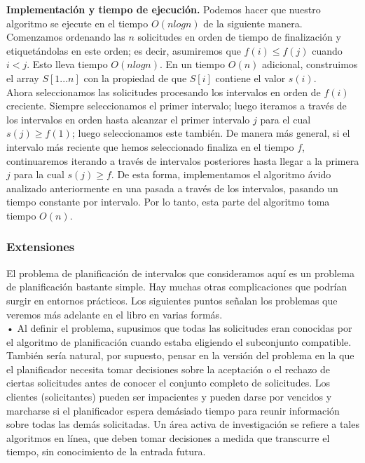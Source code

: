\documentclass[a4paper, 12pt]{book}
\begin{document}
\textbf{Implementación y tiempo de ejecución.} Podemos hacer que nuestro algoritmo se ejecute en el tiempo $O(nlogn)$ de la siguiente manera. Comenzamos ordenando las $n$ solicitudes en orden de tiempo de finalización y etiquetándolas en este orden; es decir, asumiremos que $f(i) ≤ f(j)$ cuando $i<j$. Esto lleva tiempo $O(nlogn)$. En un tiempo $O(n)$ adicional, construimos el array $S[1...n]$ con la propiedad de que $S[i]$ contiene el valor $s(i)$.\\

Ahora seleccionamos las solicitudes procesando los intervalos en orden de $f(i)$ creciente. Siempre seleccionamos el primer intervalo; luego iteramos a través de los intervalos en orden hasta alcanzar el primer intervalo $j$ para el cual $s(j) ≥ f(1)$; luego seleccionamos este también. De manera más general, si el intervalo más reciente que hemos seleccionado finaliza en el tiempo $f$, continuaremos iterando a través de intervalos posteriores hasta llegar a la primera $j$ para la cual $s(j) ≥ f$. De esta forma, implementamos el algoritmo ávido analizado anteriormente en una pasada a través de los intervalos, pasando un tiempo constante por intervalo. Por lo tanto, esta parte del algoritmo toma tiempo $O(n)$.\\

\subsubsection*{Extensiones}

El problema de planificación de intervalos que consideramos aquí es un problema de planificación bastante simple. Hay muchas otras complicaciones que podrían surgir en entornos prácticos. Los siguientes puntos señalan los problemas que veremos más adelante en el libro en varias formás.\\

    • Al definir el problema, supusimos que todas las solicitudes eran conocidas por el algoritmo de planificación cuando estaba eligiendo el subconjunto compatible. También sería natural, por supuesto, pensar en la versión del problema en la que el planificador necesita tomar decisiones sobre la aceptación o el rechazo de ciertas solicitudes antes de conocer el conjunto completo de solicitudes. Los clientes (solicitantes) pueden ser impacientes y pueden darse por vencidos y marcharse si el planificador espera demásiado tiempo para reunir información sobre todas las demás solicitadas. Un área activa de investigación se refiere a tales algoritmos en línea, que deben tomar decisiones a medida que transcurre el tiempo, sin conocimiento de la entrada futura.\\
\end{document}
